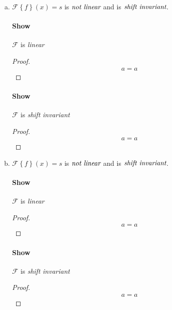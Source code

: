\documentclass{paper}
\begin{document}
\begin{enumerate}[(a)]
\paragraph{Show} $\mathcal{F}$ is \emph{shift invariant} \\
\begin{proof}
\begin{align*}
    a = a
\end{align*}
\end{proof}


\item $\mathcal{F} \left \{ f \right\} (x) = s$ is $\emph{not linear}$ and is $\emph{shift invariant}$.

\paragraph{Show} $\mathcal{F}$ is \emph{linear} \\
\begin{proof}
\begin{align*}
    a = a
\end{align*}
\end{proof}

\paragraph{Show} $\mathcal{F}$ is \emph{shift invariant} \\
\begin{proof}
\begin{align*}
    a = a
\end{align*}
\end{proof}


\item $\mathcal{F} \left \{ f \right\} (x) = s$ is $\emph{not linear}$ and is $\emph{shift invariant}$.

\paragraph{Show} $\mathcal{F}$ is \emph{linear} \\
\begin{proof}
\begin{align*}
    a = a
\end{align*}
\end{proof}

\paragraph{Show} $\mathcal{F}$ is \emph{shift invariant} \\
\begin{proof}
\begin{align*}
    a = a
\end{align*}
\end{proof}


\end{enumerate}
\end{document}
